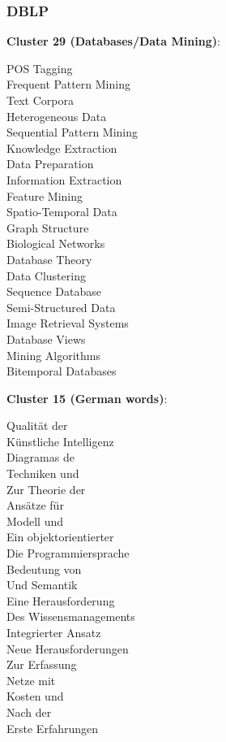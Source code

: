 \documentclass[11pt]{article}
\begin{document}
\subsubsection*{DBLP}
\textbf{Cluster 29 (Databases/Data Mining)}:
\begin{multicols}{3}
POS Tagging\\
Frequent Pattern Mining\\
Text Corpora\\
Heterogeneous Data\\
Sequential Pattern Mining\\
Knowledge Extraction\\
Data Preparation\\
Information Extraction\\
Feature Mining\\
Spatio-Temporal Data\\
Graph Structure\\
Biological Networks\\
Database Theory\\
Data Clustering\\
Sequence Database\\
Semi-Structured Data\\
Image Retrieval Systems\\
Database Views\\
Mining Algorithms\\
Bitemporal Databases
\end{multicols}

\textbf{Cluster 15 (German words)}:
\begin{multicols}{3}
Qualität der\\
Künstliche Intelligenz\\
Diagramas de\\
Techniken und\\
Zur Theorie der\\
Ansätze für\\
Modell und\\
Ein objektorientierter\\
Die Programmiersprache\\
Bedeutung von\\
Und Semantik\\
Eine Herausforderung\\
Des Wissensmanagements\\
Integrierter Ansatz\\
Neue Herausforderungen\\
Zur Erfassung\\
Netze mit\\
Kosten und\\
Nach der\\
Erste Erfahrungen
\end{multicols}
\end{document}
